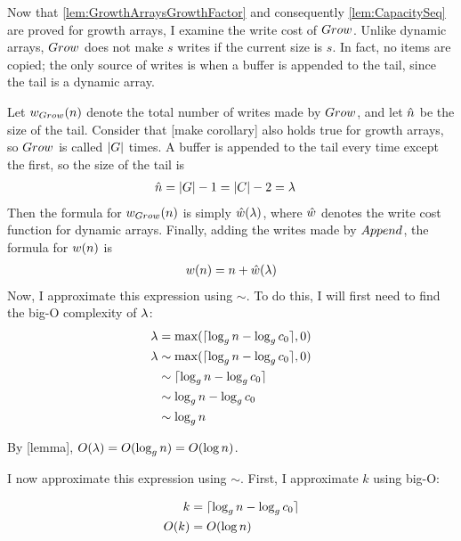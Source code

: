 Now that \ref{lem:GrowthArraysGrowthFactor} and consequently \ref{lem:CapacitySeq} are proved for growth arrays, I examine the write cost of $Grow$. Unlike dynamic arrays, $Grow$ does not make $s$ writes if the current size is $s$. In fact, no items are copied; the only source of writes is when a buffer is appended to the tail, since the tail is a dynamic array.

Let ${w}_{Grow}(n)$ denote the total number of writes made by $Grow$, and let $\hat{n}$ be the size of the tail. Consider that [make corollary] also holds true for growth arrays, so $Grow$ is called $|G|$ times. A buffer is appended to the tail every time except the first, so the size of the tail is
\begin{align*}
\hat{n} &= |G| - 1 = |C| - 2 = \lambda
\end{align*}
Then the formula for ${w}_{Grow}(n)$ is simply $\hat{w}(\lambda)$, where $\hat{w}$ denotes the write cost function for dynamic arrays. Finally, adding the writes made by $Append$, the formula for $w(n)$ is
\begin{align*}
w(n) = n + \hat{w}(\lambda)
\end{align*}
Now, I approximate this expression using $\sim$. To do this, I will first need to find the big-O complexity of $\lambda$:
\begin{align*}
\lambda &= \max(\lceil \log_{g} n - \log_{g} c_0 \rceil, 0)\\
\lambda &\sim \max(\lceil \log_{g} n - \log_{g} c_0 \rceil, 0)\\
&\sim \lceil \log_{g} n - \log_{g} c_0 \rceil\\
&\sim \log_{g} n - \log_{g} c_0\\
&\sim \log_{g} n
\end{align*}

By [lemma], $O(\lambda) = O(\log_{g} n) = O(\log n)$.


I now approximate this expression using $\sim$. First, I approximate $k$ using big-O:

\begin{align*}
k &= \lceil \log_{g} n - \log_{g} c_0 \rceil\\
O(k) &= O(\log n)
\end{align*}

